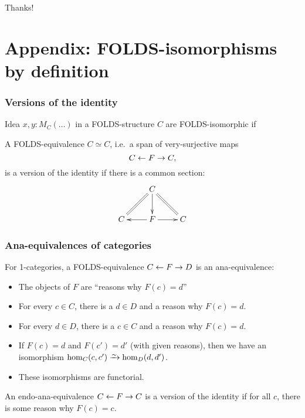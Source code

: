 \documentclass{beamer}
\begin{document}
\begin{frame}
  \begin{center}
    Thanks!
  \end{center}
\end{frame}

\appendix

\section{Appendix: FOLDS-isomorphisms by definition}
\label{sec:univalent-folds}

\begin{frame}
  \frametitle{Versions of the identity}
  \begin{block}{Idea}
    $x,y:M_C(\dots)$ in a FOLDS-structure $C$ are \alert<1>{FOLDS-isomorphic} if\\ 
  \end{block}
  \pause\pause\pause
  \begin{definition}
    A FOLDS-equivalence $C\simeq C$, i.e.\ a span of very-surjective maps
    \[ C \leftarrow F \to C, \]
    is \alert{a version of the identity} if there is a common section:
    \[ \xymatrix{ &C \ar[d] \ar@{=}[dl] \ar@{=}[dr] \\ C & F \ar[l] \ar[r] & C } \]
  \end{definition}
\end{frame}

\begin{frame}
  \frametitle{Ana-equivalences of categories}
  For 1-categories, a FOLDS-equivalence $C \leftarrow F \to D$ is an \alert<1>{ana-equivalence}:
  \begin{itemize}
  \item The objects of $F$ are ``reasons why $F(c) = d$''
  \item For every $c\in C$, there is a $d\in D$ and a reason why $F(c)=d$.
  \item For every $d\in D$, there is a $c\in C$ and a reason why $F(c)=d$.
  \item If $F(c)=d$ and $F(c')=d'$ (with given reasons), then we have an isomorphism $\hom_C(c,c') \toiso \hom_D(d,d')$.
  \item These isomorphisms are functorial.
  \end{itemize}
  \pause
  An endo-ana-equivalence $C \leftarrow F \to C$ is a \alert{version of the identity} if for all $c$, there is some reason why $F(c)=c$.
\end{frame}
\end{document}
